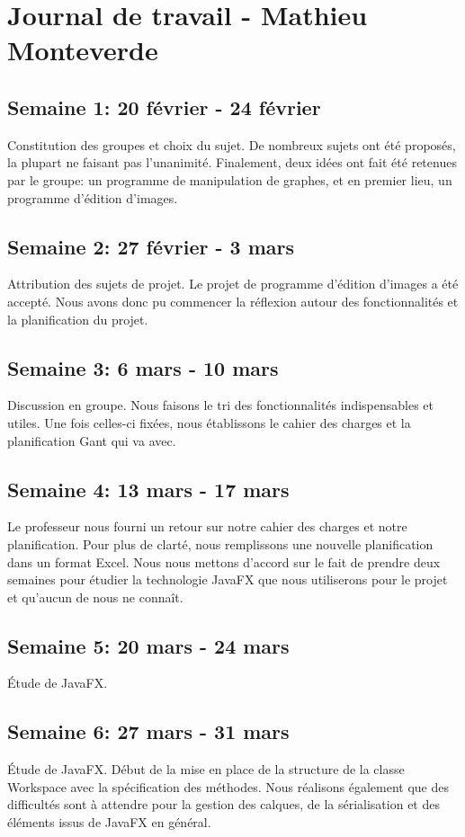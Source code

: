 \section{Journal de travail - Mathieu Monteverde}

\subsection{Semaine 1: 20 février - 24 février}
Constitution des groupes et choix du sujet. De nombreux sujets ont été proposés, la plupart ne faisant pas l'unanimité. Finalement, deux idées ont fait été retenues par le groupe: un programme de manipulation de graphes, et en premier lieu, un programme d'édition d'images.
\subsection{Semaine 2: 27 février - 3 mars}
Attribution des sujets de projet. Le projet de programme d'édition d'images a été accepté. Nous avons donc pu commencer la réflexion autour des fonctionnalités et la planification du projet.
\subsection{Semaine 3: 6 mars - 10 mars}
Discussion en groupe. Nous faisons le tri des fonctionnalités indispensables et utiles. Une fois celles-ci fixées, nous établissons le cahier des charges et la planification Gant qui va avec.
\subsection{Semaine 4: 13 mars - 17 mars}
Le professeur nous fourni un retour sur notre cahier des charges et notre planification. Pour plus de clarté, nous remplissons une nouvelle planification dans un format Excel. Nous nous mettons d'accord sur le fait de prendre deux semaines pour étudier la technologie JavaFX que nous utiliserons pour le projet et qu'aucun de nous ne connaît.
\subsection{Semaine 5: 20 mars - 24 mars}
Étude de JavaFX.
\subsection{Semaine 6: 27 mars - 31 mars}
Étude de JavaFX. Début de la mise en place de la structure de la classe Workspace avec la spécification des méthodes. Nous réalisons également que des difficultés sont à attendre pour la gestion des calques, de la sérialisation et des éléments issus de JavaFX en général.
